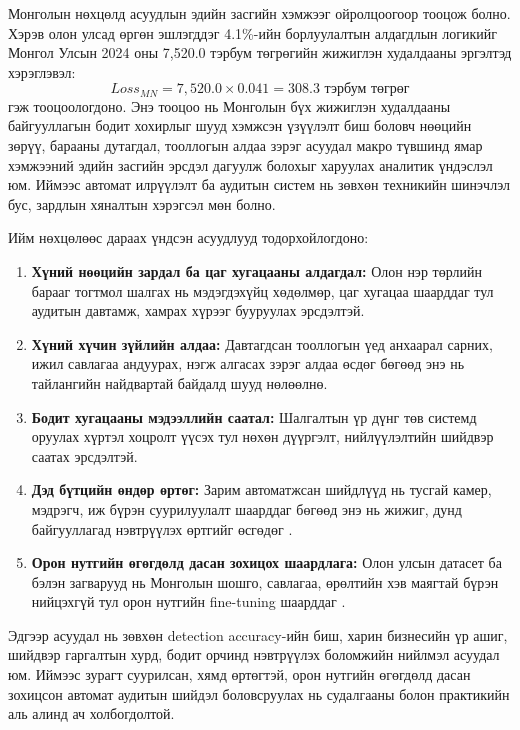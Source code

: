 Монголын нөхцөлд асуудлын эдийн засгийн хэмжээг ойролцоогоор тооцож болно. Хэрэв олон улсад өргөн эшлэгддэг 4.1\%-ийн борлуулалтын алдагдлын логикийг \cite{mckendrick_ai} Монгол Улсын 2024 оны 7{,}520.0 тэрбум төгрөгийн жижиглэн худалдааны эргэлтэд хэрэглэвэл:
\begin{equation}
Loss_{MN} = 7{,}520.0 \times 0.041 = 308.3 \text{ тэрбум төгрөг}
\end{equation}
гэж тооцоологдоно. Энэ тооцоо нь Монголын бүх жижиглэн худалдааны байгууллагын бодит хохирлыг шууд хэмжсэн үзүүлэлт биш боловч нөөцийн зөрүү, барааны дутагдал, тооллогын алдаа зэрэг асуудал макро түвшинд ямар хэмжээний эдийн засгийн эрсдэл дагуулж болохыг харуулах аналитик үндэслэл юм. Иймээс автомат илрүүлэлт ба аудитын систем нь зөвхөн техникийн шинэчлэл бус, зардлын хяналтын хэрэгсэл мөн болно.

Ийм нөхцөлөөс дараах үндсэн асуудлууд тодорхойлогдоно:

\begin{enumerate}
\item \textbf{Хүний нөөцийн зардал ба цаг хугацааны алдагдал:} Олон нэр төрлийн барааг тогтмол шалгах нь мэдэгдэхүйц хөдөлмөр, цаг хугацаа шаарддаг тул аудитын давтамж, хамрах хүрээг бууруулах эрсдэлтэй.
\item \textbf{Хүний хүчин зүйлийн алдаа:} Давтагдсан тооллогын үед анхаарал сарних, ижил савлагаа андуурах, нэгж алгасах зэрэг алдаа өсдөг бөгөөд энэ нь тайлангийн найдвартай байдалд шууд нөлөөлнө.
\item \textbf{Бодит хугацааны мэдээллийн саатал:} Шалгалтын үр дүнг төв системд оруулах хүртэл хоцролт үүсэх тул нөхөн дүүргэлт, нийлүүлэлтийн шийдвэр саатах эрсдэлтэй.
\item \textbf{Дэд бүтцийн өндөр өртөг:} Зарим автоматжсан шийдлүүд нь тусгай камер, мэдрэгч, иж бүрэн суурилуулалт шаарддаг бөгөөд энэ нь жижиг, дунд байгууллагад нэвтрүүлэх өртгийг өсгөдөг \cite{amazon_go}.
\item \textbf{Орон нутгийн өгөгдөлд дасан зохицох шаардлага:} Олон улсын датасет ба бэлэн загварууд нь Монголын шошго, савлагаа, өрөлтийн хэв маягтай бүрэн нийцэхгүй тул орон нутгийн fine-tuning шаарддаг \cite{transfer_learning,retail_cv_survey}.
\end{enumerate}

Эдгээр асуудал нь зөвхөн detection accuracy-ийн биш, харин бизнесийн үр ашиг, шийдвэр гаргалтын хурд, бодит орчинд нэвтрүүлэх боломжийн нийлмэл асуудал юм. Иймээс зурагт суурилсан, хямд өртөгтэй, орон нутгийн өгөгдөлд дасан зохицсон автомат аудитын шийдэл боловсруулах нь судалгааны болон практикийн аль алинд ач холбогдолтой.

